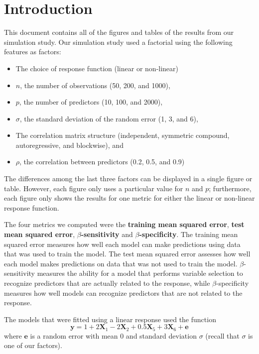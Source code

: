 \documentclass{article}
\begin{document}
\tableofcontents

\newpage
\section{Introduction}

This document contains all of the figures and tables of the results from our simulation study. Our simulation study used a factorial using the following features as factors:
\begin{itemize}
	\item The choice of response function (linear or non-linear)
	\item $n$, the number of observations (50, 200, and 1000),
	\item $p$, the number of predictors (10, 100, and 2000),
	\item $\sigma$, the standard deviation of the random error (1, 3, and 6),
	\item The correlation matrix structure (independent, symmetric compound, autoregressive, and blockwise), and
	\item $\rho$, the correlation between predictors (0.2, 0.5, and 0.9)
\end{itemize}
The differences among the last three factors can be displayed in a single figure or table. However, each figure only uses a particular value for $n$ and $p$; furthermore, each figure only shows the results for one metric for either the linear or non-linear response function.

The four metrics we computed were the \textbf{training mean squared error}, \textbf{test mean squared error}, \textbf{$\beta$-sensitivity} and \textbf{$\beta$-specificity}. The training mean squared error measures how well each model can make predictions using data that was used to train the model. The test mean squared error assesses how well each model makes predictions on data that was not used to train the model. $\beta$-sensitivity measures the ability for a model that performs variable selection to recognize predictors that are actually related to the response, while $\beta$-specificity measures how well models can recognize predictors that are not related to the response.

The models that were fitted using a linear response used the function
\begin{equation}\label{eqn:linear-response}
	\mathbf{y} = 1 + 2\mathbf{X}_1 - 2\mathbf{X}_2 + 0.5\mathbf{X}_5 + 3\mathbf{X}_6 + \mathbf{e}
\end{equation}
where $\mathbf{e}$ is a random error with mean 0 and standard deviation $\sigma$ (recall that $\sigma$ is one of our factors).
\end{document}
